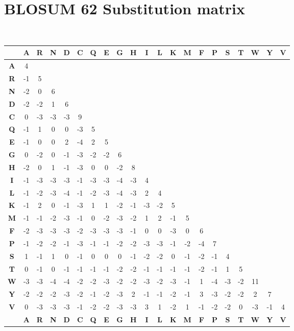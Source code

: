 \documentclass[landscape]{foils}
\begin{document}
\section*{BLOSUM 62 Substitution matrix}
\setlength{\hoffset}{-0.75in}
{
\tiny
{\tt
\begin{tabular}{c|cc|cc|cc|cc|cc|cc|cc|cc|cc|cc|}
& {\bf A} & {\bf R} & {\bf N} & {\bf D} & {\bf C} & {\bf Q} & {\bf E} & {\bf G} & {\bf H} & {\bf I} & {\bf L} & {\bf K} & {\bf M } & {\bf F} & {\bf P} & {\bf S} & {\bf T} & {\bf W} & {\bf Y} & {\bf V} \\
\hline
{\bf A} & 4 & &&&&&&&&&&&&&&&&&& \\
{\bf R} & -1 & 5 &  &&&&&&&&&&&&&&&&&\\
\hline
{\bf N} & -2 & 0 & 6 &&&&&&&&&&&&&&&&&\\
{\bf D} &-2  &-2&1&6&&&&&&&&&&&&&&&&\\
\hline
{\bf C} &0  &-3 & -3 & -3 &9&&&&&&&&&&&&&&&\\
{\bf Q} &-1  &1&0&0&-3&5&&&&&&&&&&&&&&\\
\hline
{\bf E} &-1  &0&0&2&-4&2&5&&&&&&&&&&&&&\\
{\bf G} &0  &-2&0&-1&-3&-2&-2&6&&&&&&&&&&&&\\
\hline
{\bf H} &-2&0&1&-1&-3&0&0&-2&8&&&&&&&&&&&\\
{\bf I} & -1&-3&-3&-3&-1&-3&-3&-4&-3&4&&&&&&&&&&\\
\hline
{\bf L} &-1  &-2&-3&-4&-1&-2&-3&-4&-3&2&4&&&&&&&&&\\
{\bf K} &-1&2&0&-1&-3&1&1&-2&-1&-3&-2&5&&&&&&&&\\
\hline
{\bf M} &-1&-1&-2&-3&-1&0&-2&-3&-2&1&2&-1&5&&&&&&&\\
{\bf F} &-2&-3&-3&-3&-2&-3&-3&-3&-1&0&0&-3&0&6&&&&&&\\
\hline
{\bf P} &-1&-2&-2&-1&-3&-1&-1&-2&-2&-3&-3&-1&-2&-4&7&&&&&\\
{\bf S} &1&-1&1&0&-1&0&0&0&-1&-2&-2&0&-1&-2&-1&4&&&&\\
\hline
{\bf T} & 0 &-1 &0&-1&-1&-1&-1&-2&-2&-1&-1&-1&-1&-2&-1&1&5&&&\\
{\bf W} & -3 &-3 &-4&-4&-2&-2&-3&-2&-2&-3&-2&-3&-1&1&-4&-3&-2&11&&\\
\hline
{\bf Y} & -2 &-2 &-2&-3&-2&-1&-2&-3&2&-1&-1&-2&-1&3&-3&-2&-2&2&7&\\
{\bf V} & 0& -3&-3&-3&-1&-2&-2&-3&-3&3&1&-2&1&-1&-2&-2&0&-3&-1&4\\
\hline
& {\bf A} & {\bf R} & {\bf N} & {\bf D} & {\bf C} & {\bf Q} & {\bf E} & {\bf G} & {\bf H} & {\bf I} & {\bf L} & {\bf K} & {\bf M } & {\bf F} & {\bf P} & {\bf S} & {\bf T} & {\bf W} & {\bf Y} & {\bf V} \\
\end{tabular}
}
}
\end{document}
